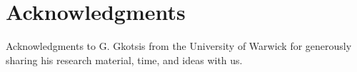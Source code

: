 \section*{Acknowledgments}
\label{acknowledgments}

Acknowledgments to G. Gkotsis from the University of Warwick
for generously sharing his research material, time, and ideas with us.

